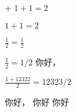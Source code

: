 $+$
$1+1 = 2$

$1+1 = 2$

$\frac{1}{2} = \frac{1}{2}$

$\frac{1}{2} = 1/2$
你好，

$\frac{1+12322}{2} = 12323/2$

你好，
你好
你好
